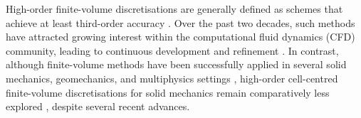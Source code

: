 \documentclass[review,3p]{elsarticle}
\begin{document}
%
%
%
%
High-order finite-volume discretisations are generally defined as schemes that achieve at least third-order accuracy \cite{wang2013}. Over the past two decades, such methods have attracted growing interest within the computational fluid dynamics (CFD) community, leading to continuous development and refinement \cite{Tsoutsanis2025, Nishikawa2025, Costa2022, Costa2023, Antoniadis2022}. 
%
%
{\color{orange}In contrast, although finite-volume methods have been successfully applied in several solid mechanics, geomechanics, and multiphysics settings \cite{Nordbotten2015,Keilegavlen2017,Nilsen2018}, high-order cell-centred finite-volume discretisations for solid mechanics remain comparatively less explored} \cite{Demirdzic2016, Castrillo2022, Castrillo2024}, despite several recent advances.
\end{document}
